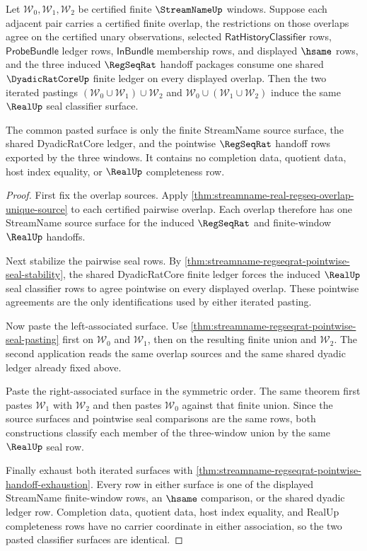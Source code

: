 \begin{theorem}
\label{thm:streamname-regseqrat-pasted-seal-associativity}
Let $\mathcal{W}_0,\mathcal{W}_1,\mathcal{W}_2$ be certified finite
$\StreamNameUp$ windows. Suppose each adjacent pair carries a certified finite
overlap, the restrictions on those overlaps agree on the certified unary
observations, selected $\mathsf{RatHistoryClassifier}$ rows,
$\mathsf{ProbeBundle}$ ledger rows, $\mathsf{InBundle}$ membership rows, and
displayed $\hsame$ rows, and the three induced $\RegSeqRat$ handoff packages
consume one shared $\DyadicRatCoreUp$ finite ledger on every displayed
overlap. Then the two iterated pastings
$(\mathcal{W}_0 \cup \mathcal{W}_1) \cup \mathcal{W}_2$ and
$\mathcal{W}_0 \cup (\mathcal{W}_1 \cup \mathcal{W}_2)$ induce the same
$\RealUp$ seal classifier surface.

The common pasted surface is only the finite StreamName source surface,
the shared DyadicRatCore ledger, and the pointwise $\RegSeqRat$ handoff rows
exported by the three windows. It contains no completion data, quotient data,
host index equality, or $\RealUp$ completeness row.
\end{theorem}
\begin{proof}
First fix the overlap sources. Apply
\autoref{thm:streamname-real-regseq-overlap-unique-source} to each certified
pairwise overlap. Each overlap therefore has one StreamName source surface for
the induced $\RegSeqRat$ and finite-window $\RealUp$ handoffs.

Next stabilize the pairwise seal rows. By
\autoref{thm:streamname-regseqrat-pointwise-seal-stability}, the shared
DyadicRatCore finite ledger forces the induced $\RealUp$ seal classifier rows
to agree pointwise on every displayed overlap. These pointwise agreements are
the only identifications used by either iterated pasting.

Now paste the left-associated surface. Use
\autoref{thm:streamname-regseqrat-pointwise-seal-pasting} first on
$\mathcal{W}_0$ and $\mathcal{W}_1$, then on the resulting finite union and
$\mathcal{W}_2$. The second application reads the same overlap sources and
the same shared dyadic ledger already fixed above.

Paste the right-associated surface in the symmetric order. The same theorem
first pastes $\mathcal{W}_1$ with $\mathcal{W}_2$ and then pastes
$\mathcal{W}_0$ against that finite union. Since the source surfaces and
pointwise seal comparisons are the same rows, both constructions classify
each member of the three-window union by the same $\RealUp$ seal row.

Finally exhaust both iterated surfaces with
\autoref{thm:streamname-regseqrat-pointwise-handoff-exhaustion}. Every row in
either surface is one of the displayed StreamName finite-window rows, an
$\hsame$ comparison, or the shared dyadic ledger row. Completion data,
quotient data, host index equality, and RealUp completeness rows have no
carrier coordinate in either association, so the two pasted classifier
surfaces are identical.
\end{proof}


